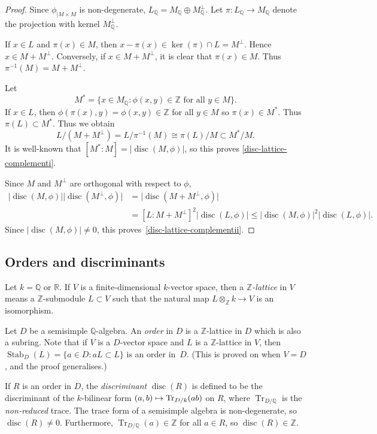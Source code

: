 \documentclass[JEP,XML,SOM,Unicode,NoFloatCountersInSection]{cedram}
\def\mto{\mathchoice{\longmapsto}{\mapsto}{\mapsto}{\mapsto}}
\newcommand{\bQ}{\mathbb{Q}}
\newcommand{\bR}{\mathbb{R}}
\newcommand{\bZ}{\mathbb{Z}}
\DeclareMathOperator{\disc}{disc}
\DeclareMathOperator{\Stab}{Stab}
\DeclareMathOperator{\Tr}{Tr}
\newcommand{\abs}[1]{\lvert #1 \rvert}
\newcommand{\defterm}[1]{\emph{#1}}
\begin{document}
\begin{proof}
Since $\phi_{|M \times M}$ is non-degenerate, $L_\bQ = M_\bQ \oplus M_\bQ^\perp$.
Let $\pi \colon L_\bQ \to M_\bQ$ denote the projection with kernel $M_\bQ^\perp$.

If $x \in L$ and $\pi(x) \in M$, then $x-\pi(x) \in \ker(\pi) \cap L = M^\perp$.
Hence $x \in M + M^\perp$.
Conversely, if $x \in M + M^\perp$, it is clear that $\pi(x) \in M$.
Thus $\pi^{-1}(M) = M + M^\perp$.

Let
\[
M^* = \{ x \in M_\bQ : \phi(x, y) \in \bZ \text{ for all } y \in M \}.
\]
If $x \in L$, then $\phi(\pi(x),y) = \phi(x,y) \in \bZ$ for all $y \in M$ so $\pi(x) \in M^*$.
Thus $\pi(L) \subset M^*$.
Thus we obtain
\[
L/(M + M^\perp) = L/\pi^{-1}(M) \cong \pi(L)/M \subset M^*/M.
\]
It is well-known that $[M^*:M] = \abs{\disc(M,\phi)}$, so this proves \eqref{disc-lattice-complementi}.

Since $M$ and $M^\perp$ are orthogonal with respect to $\phi$,
\begin{align*}
\abs{\disc(M, \phi)} \abs{\disc(M^\perp, \phi)}
& = \abs{\disc(M + M^\perp, \phi)}
\\& = [L:M+M^\perp]^2 \abs{\disc(L, \phi)}
\leq \abs{\disc(M, \phi)}^2 \abs{\disc(L, \phi)}.
\end{align*}
Since $\abs{\disc(M, \phi)} \neq 0$, this proves~\eqref{disc-lattice-complementii}.
\end{proof}

\subsection{Orders and discriminants}\label{sec:orders}

Let $k = \bQ$ or $\bR$.
If $V$ is a finite-dimensional $k$\nobreakdash-vector space, then a \defterm{$\bZ$-lattice} in $V$ means a $\bZ$-submodule $L \subset V$ such that the natural map $L \otimes_\bZ k \to V$ is an isomorphism.

Let $D$ be a semisimple $\bQ$-algebra.
An \defterm{order} in $D$ is a $\bZ$-lattice in $D$ which is also a subring.
Note that if $V$ is a $D$-vector space and $L$ is a $\bZ$-lattice in $V$, then $\Stab_D(L) = \{ a \in D : aL \subset L \}$ is an order in~$D$. (This is proved on \cite[p.\,109]{Rei75} when $V=D$, and the proof generalises.)

If $R$ is an order in $D$, the \defterm{discriminant} $\disc(R)$ is defined to be the discriminant of the $k$-bilinear form $(a,b) \mto \Tr_{D/k}(ab)$ on $R$, where $\Tr_{D/\bQ}$ is the \emph{non-reduced} trace.
The trace form of a semisimple algebra is non-degenerate, so $\disc(R) \neq 0$.
Furthermore, $\Tr_{D/\bQ}(a) \in \bZ$ for all $a \in R$, so $\disc(R) \in \bZ$.
\end{document}
